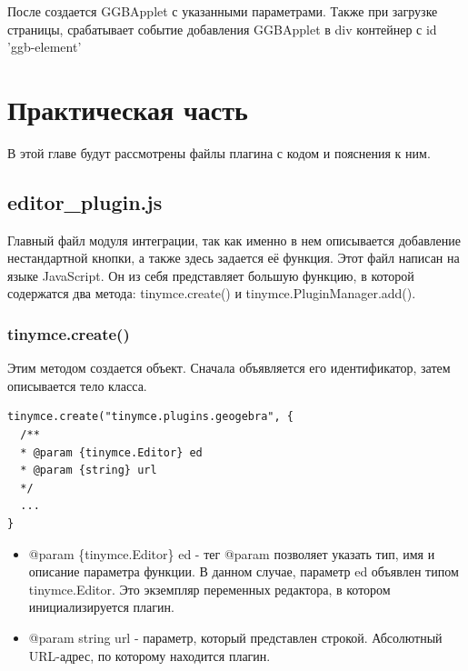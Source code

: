 \documentclass[14pt,Diplom]{diplomwork}
\begin{document}
После создается GGBApplet с указанными параметрами. Также при загрузке страницы, срабатывает событие добавления GGBApplet в div контейнер с id 'ggb-element'


 
\chapter{Практическая часть}
В этой главе будут рассмотрены файлы плагина с кодом и пояснения к ним. 
\section{editor\_plugin.js}
Главный файл модуля интеграции, так как именно в нем описывается добавление нестандартной кнопки, а также здесь задается её функция. Этот файл написан на языке JavaScript. Он из себя представляет большую функцию, в которой содержатся два метода: tinymce.create() и tinymce.PluginManager.add().

\subsection{tinymce.create()}
Этим методом создается объект. Сначала объявляется его идентификатор, затем описывается тело класса.

\begin{verbatim} 
tinymce.create("tinymce.plugins.geogebra", {
  /**
  * @param {tinymce.Editor} ed 
  * @param {string} url 
  */
  ...
}
\end{verbatim}

\begin{itemize}
	\item   @param \{tinymce.Editor\} ed  - тег @param позволяет указать тип, имя и описание параметра функции. В данном случае, параметр ed объявлен типом tinymce.Editor. Это экземпляр переменных редактора, в котором инициализируется плагин.
	\item @param {string} url - параметр, который представлен строкой. Абсолютный URL-адрес, по которому находится плагин.
\end{itemize}
\end{document}

